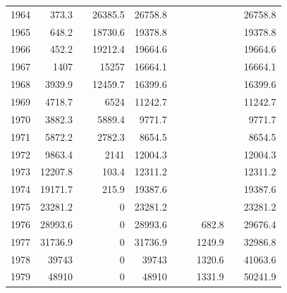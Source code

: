 \documentclass[]{article}
\begin{document}
\begin{table}[ht]
\begin{tabular}{lrrrrrrrrr}
1964 & 373.3          &               & 26385.5 & 26758.8 &             &         &               &                & 26758.8     \\
1965 & 648.2          &               & 18730.6 & 19378.8 &             &         &               &                & 19378.8     \\
1966 & 452.2          &               & 19212.4 & 19664.6 &             &         &               &                & 19664.6     \\
1967 & 1407           &               & 15257   & 16664.1 &             &         &               &                & 16664.1     \\
1968 & 3939.9         &               & 12459.7 & 16399.6 &             &         &               &                & 16399.6     \\
1969 & 4718.7         &               & 6524    & 11242.7 &             &         &               &                & 11242.7     \\
1970 & 3882.3         &               & 5889.4  & 9771.7  &             &         &               &                & 9771.7      \\
1971 & 5872.2         &               & 2782.3  & 8654.5  &             &         &               &                & 8654.5      \\
1972 & 9863.4         &               & 2141    & 12004.3 &             &         &               &                & 12004.3     \\
1973 & 12207.8        &               & 103.4   & 12311.2 &             &         &               &                & 12311.2     \\
1974 & 19171.7        &               & 215.9   & 19387.6 &             &         &               &                & 19387.6     \\
1975 & 23281.2        &               & 0       & 23281.2 &             &         &               &                & 23281.2     \\
1976 & 28993.6        &               & 0       & 28993.6 &             &         & 682.8         &                & 29676.4     \\
1977 & 31736.9        &               & 0       & 31736.9 &             &         & 1249.9        &                & 32986.8     \\
1978 & 39743          &               & 0       & 39743   &             &         & 1320.6        &                & 41063.6     \\
1979 & 48910          &               & 0       & 48910   &             &         & 1331.9        &                & 50241.9     \\

\end{tabular}
\end{table}
\end{document}
